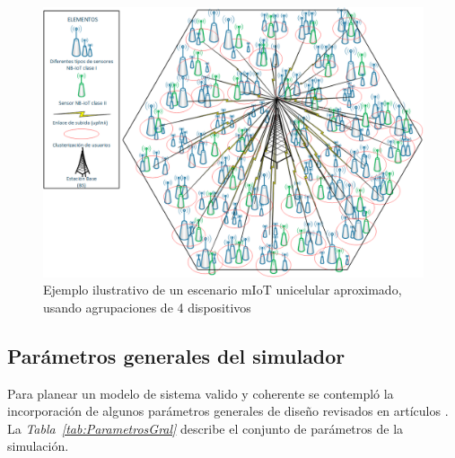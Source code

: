 \begin{figure}[th]
\centering
\includegraphics[scale=.6]{Figures/Escenario mIoT unicelda}
\decoRule
\caption[Ejemplo ilustrativo de un escenario mIoT unicelular aproximado, usando agrupaciones de 4 dispositivos]{Ejemplo ilustrativo de un escenario mIoT unicelular aproximado, usando agrupaciones de 4 dispositivos}
\label{fig:EscenarioMTC}
\end{figure}

\subsection{Parámetros generales del simulador}\label{parametrossimulador}

Para planear un modelo de sistema valido y coherente se contempló la incorporación de algunos parámetros generales de diseño revisados en artículos \parencite{}. La \textit{Tabla~\ref{tab:ParametrosGral}} describe el conjunto de parámetros de la simulación.

